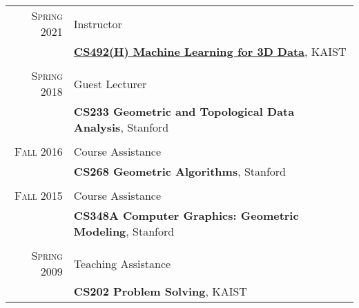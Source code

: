 \documentclass[letterpaper,10pt]{article} %
\newcommand{\blankline}{\quad\pagebreak[2]}
\begin{document}
{{\begin{tabular}{r|p{11cm}}

\textsc{Spring 2021} & Instructor\\
& \href{https://mhsung.github.io/courses/kaist-cs492h-spring-2021/}{\textbf{CS492(H) Machine Learning for 3D Data}}, KAIST\\
& \\


\textsc{Spring 2018} & Guest Lecturer\\
& \textbf{CS233 Geometric and Topological Data Analysis}, Stanford\\
& \\


\textsc{Fall 2016} & Course Assistance\\
& \textbf{CS268 Geometric Algorithms}, Stanford\\
& \\


\textsc{Fall 2015} & Course Assistance\\
& \textbf{CS348A Computer Graphics: Geometric Modeling}, Stanford\\
& \\


\textsc{Spring 2009} & Teaching Assistance\\
& \textbf{CS202 Problem Solving}, KAIST\\
\end{tabular}\\

\blankline



}}
\end{document}
